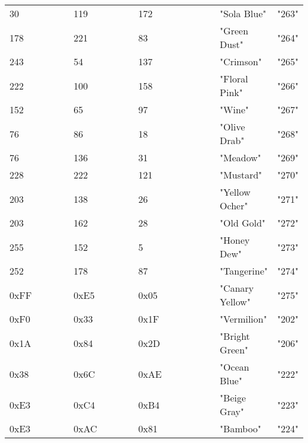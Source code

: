 \begin{longtable}{p{0.3\linewidth} p{0.3\linewidth} p{0.4\linewidth}}
30 &  119 &  172 &  "Sola Blue" &  "263"\\
178 &  221 &  83 &  "Green Dust" &  "264"\\
243 &  54 &  137 &  "Crimson" &  "265"\\
222 &  100 &  158 &  "Floral Pink" &  "266"\\
152 &  65 &  97 &  "Wine" &  "267"\\
76 &  86 &  18 &  "Olive Drab" &  "268"\\
76 &  136 &  31 &  "Meadow" &  "269"\\
228 &  222 &  121 &  "Mustard" &  "270"\\
203 &  138 &  26 &  "Yellow Ocher" &  "271"\\
203 &  162 &  28 &  "Old Gold" &  "272"\\
255 &  152 &  5 &  "Honey Dew" &  "273"\\
252 &  178 &  87 &  "Tangerine" &  "274"\\
0xFF &  0xE5 &  0x05 &  "Canary Yellow" &  "275"\\
0xF0 &  0x33 &  0x1F &  "Vermilion" &  "202"\\
0x1A &  0x84 &  0x2D &  "Bright Green" &  "206"\\
0x38 &  0x6C &  0xAE &  "Ocean Blue" &  "222"\\
0xE3 &  0xC4 &  0xB4 &  "Beige Gray" &  "223"\\
0xE3 &  0xAC &  0x81 &  "Bamboo" &  "224"\\

\end{longtable}
